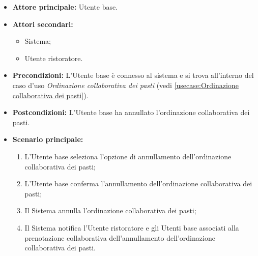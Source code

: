 \label{usecase:Annullamento della prenotazione}
\begin{itemize}
	\item \textbf{Attore principale:} Utente base.

	\item \textbf{Attori secondari:}
	      \begin{itemize}
		      \item Sistema;
		      \item Utente ristoratore.
	      \end{itemize}

	\item \textbf{Precondizioni:}
	      L'Utente base è connesso al sistema e si trova all'interno del caso
	      d'uso \textit{Ordinazione collaborativa dei pasti} (vedi
	      \autoref{usecase:Ordinazione collaborativa dei pasti}).

	\item \textbf{Postcondizioni:}
	      L'Utente base ha annullato l'ordinazione collaborativa dei pasti.

	\item \textbf{Scenario principale:}
	      \begin{enumerate}
		      \item L'Utente base seleziona l'opzione di annullamento
		            dell'ordinazione collaborativa dei pasti;

		      \item L'Utente base conferma l'annullamento dell'ordinazione
		            collaborativa dei pasti;

		      \item Il Sistema annulla l'ordinazione collaborativa dei pasti;

		      \item Il Sistema notifica l'Utente ristoratore e gli Utenti base
		            associati alla prenotazione collaborativa dell'annullamento
		            dell'ordinazione collaborativa dei pasti.
	      \end{enumerate}
\end{itemize}
